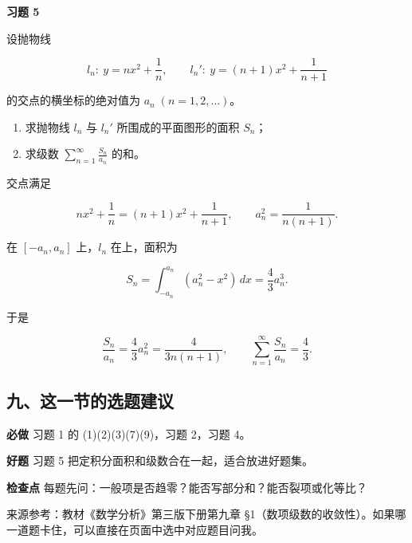 \begin{exercisebox}
\textbf{习题 5 }

设抛物线

\[
        l_n:\ y=nx^2+\frac1n,\qquad
        l_n':\ y=(n+1)x^2+\frac1{n+1}
      \]

的交点的横坐标的绝对值为 \(a_n\;(n=1,2,\ldots)\)。

\begin{enumerate}
 \item 求抛物线 \(l_n\) 与 \(l_n'\) 所围成的平面图形的面积 \(S_n\)；
 \item 求级数 \(\displaystyle \sum_{n=1}^{\infty}\frac{S_n}{a_n}\) 的和。
 \end{enumerate}

\begin{hintbox}
交点满足

\[
        nx^2+\frac1n=(n+1)x^2+\frac1{n+1},
        \qquad
        a_n^2=\frac1{n(n+1)}.
        \]

在 \([-a_n,a_n]\) 上，\(l_n\) 在上，面积为

\[
        S_n=\int_{-a_n}^{a_n}(a_n^2-x^2)\,dx
        =
        \frac43a_n^3.
        \]

于是

\[
        \frac{S_n}{a_n}=\frac43a_n^2=\frac4{3n(n+1)},
        \qquad
        \sum_{n=1}^{\infty}\frac{S_n}{a_n}
        =
        \frac43.
        \]
\end{hintbox}
\end{exercisebox}

\subsection*{九、这一节的选题建议}

\begin{conceptbox}
\textbf{必做}
习题 1 的 (1)(2)(3)(7)(9)，习题 2，习题 4。
\end{conceptbox}

\begin{conceptbox}
\textbf{好题}
习题 5 把定积分面积和级数合在一起，适合放进好题集。
\end{conceptbox}

\begin{conceptbox}
\textbf{检查点}
每题先问：一般项是否趋零？能否写部分和？能否裂项或化等比？
\end{conceptbox}

来源参考：教材《数学分析》第三版下册第九章 §1（数项级数的收敛性）。如果哪一道题卡住，可以直接在页面中选中对应题目问我。
